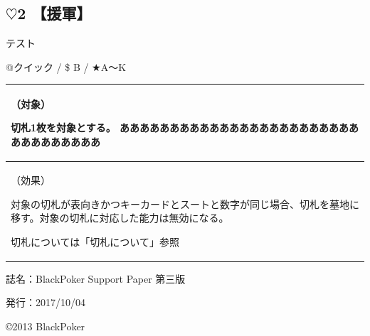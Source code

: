 \documentclass[twocolumn,a5paper,papersize,10pt]{jarticle}
\begin{document}
\subsection*{ {\normalsize $\heartsuit$}2 【援軍】} %
\vspace{-0.5zh}

テスト

\begin{tcolorbox}[title=【Action】援軍]


@クイック
  / \$ B
  / ★A〜K

\vspace{-1.2zh}%
\begin{spacing}{0.8}%
\begin{center}

\begin{tabularx}{5.8cm}{p{5.4cm}} \toprule[0.4pt]
（対象）

切札1枚を対象とする。
あああああああああああああああああああああああああああああああああ
\\ \midrule[0.4pt]
（効果）

対象の切札が表向きかつキーカードとスートと数字が同じ場合、切札を墓地に移す。対象の切札に対応した能力は無効になる。 

切札については「切札について」参照

\end{tabularx}

\vspace{-4zh}
\end{center}
\end{spacing}

\end{tcolorbox}

\vspace{-4zh}

\thispagestyle{empty}
\begin{flushright}
\begin{minipage}{0.6\hsize}
\begin{description}
  \item{誌名：}BlackPoker Support Paper 第三版
  \item{発行：}2017/10/04
\end{description}
\end{minipage}
\end{flushright}

\begin{flushright}
\copyright 2013 BlackPoker
\end{flushright}
\end{document}
